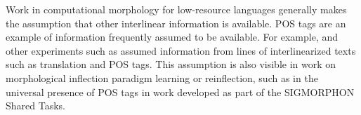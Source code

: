 Work in computational morphology for low-resource languages generally makes the assumption that other interlinear information is available. POS tags are an example of information frequently assumed to be available. For example, 
\citet{mcmillan-major_automating_2020} and other experiments such as \citet{samardzic_automatic_2015} assumed information from lines of interlinearized texts such as translation and POS tags. This assumption is also visible in work on morphological inflection paradigm learning or reinflection, such as in the universal presence of POS tags in work developed as part of the SIGMORPHON Shared Tasks. 
